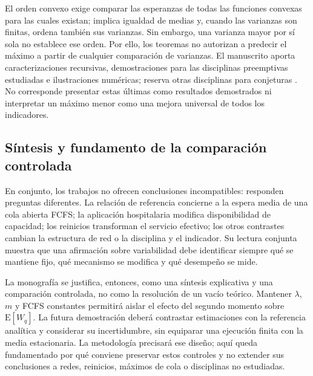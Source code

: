 El orden convexo exige comparar las esperanzas de todas las funciones convexas para las cuales existan; implica igualdad de medias y, cuando las varianzas son finitas, ordena también sus varianzas. Sin embargo, una varianza mayor por sí sola no establece ese orden. Por ello, los teoremas no autorizan a predecir el máximo a partir de cualquier comparación de varianzas. El manuscrito aporta caracterizaciones recursivas, demostraciones para las disciplinas preemptivas estudiadas e ilustraciones numéricas; reserva otras disciplinas para conjeturas \cite{koole2005maximos}. No corresponde presentar estas últimas como resultados demostrados ni interpretar un máximo menor como una mejora universal de todos los indicadores.

\subsection{Síntesis y fundamento de la comparación controlada}
\label{subsec:literatura-sintesis}

En conjunto, los trabajos no ofrecen conclusiones incompatibles: responden preguntas diferentes. La relación de referencia concierne a la espera media de una cola abierta FCFS; la aplicación hospitalaria modifica disponibilidad de capacidad; los reinicios transforman el servicio efectivo; los otros contrastes cambian la estructura de red o la disciplina y el indicador. Su lectura conjunta muestra que una afirmación sobre variabilidad debe identificar siempre qué se mantiene fijo, qué mecanismo se modifica y qué desempeño se mide.

La monografía se justifica, entonces, como una síntesis explicativa y una comparación controlada, no como la resolución de un vacío teórico. Mantener $\lambda$, $m$ y FCFS constantes permitirá aislar el efecto del segundo momento sobre $\mathrm{E}[W_q]$. La futura demostración deberá contrastar estimaciones con la referencia analítica y considerar su incertidumbre, sin equiparar una ejecución finita con la media estacionaria. La metodología precisará ese diseño; aquí queda fundamentado por qué conviene preservar estos controles y no extender sus conclusiones a redes, reinicios, máximos de cola o disciplinas no estudiadas.
